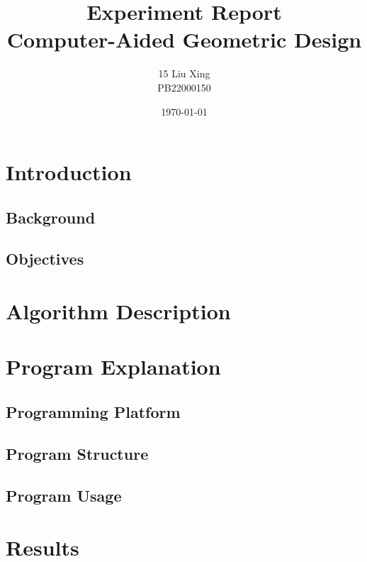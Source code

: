 \documentclass[12pt,a4paper]{report}
\title{
    \vspace{3cm}
    \textbf{Experiment Report}\\[0.5cm]
    \Large Computer-Aided Geometric Design\\[0.5cm]
    \vspace{2cm}
}
\author{15 Liu Xing \\ PB22000150}
\date{\today}
\begin{document}
\maketitle
\tableofcontents
\newpage

\chapter{Introduction}
    \section{Background}

    \section{Objectives}

\chapter{Algorithm Description}

\chapter{Program Explanation}
    \section{Programming Platform}

    \section{Program Structure}

    \section{Program Usage}

\chapter{Results}
\end{document}
